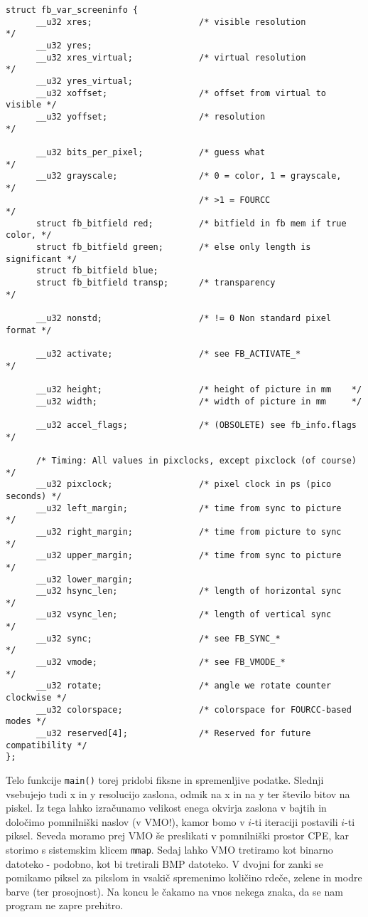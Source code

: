 \documentclass{article}
\begin{document}
\begin{verbatim}
struct fb_var_screeninfo {
      __u32 xres;                     /* visible resolution           */
      __u32 yres;
      __u32 xres_virtual;             /* virtual resolution           */
      __u32 yres_virtual;
      __u32 xoffset;                  /* offset from virtual to visible */
      __u32 yoffset;                  /* resolution                   */

      __u32 bits_per_pixel;           /* guess what                   */
      __u32 grayscale;                /* 0 = color, 1 = grayscale,    */
                                      /* >1 = FOURCC                  */
      struct fb_bitfield red;         /* bitfield in fb mem if true color, */
      struct fb_bitfield green;       /* else only length is significant */
      struct fb_bitfield blue;
      struct fb_bitfield transp;      /* transparency                 */

      __u32 nonstd;                   /* != 0 Non standard pixel format */

      __u32 activate;                 /* see FB_ACTIVATE_*            */

      __u32 height;                   /* height of picture in mm    */
      __u32 width;                    /* width of picture in mm     */

      __u32 accel_flags;              /* (OBSOLETE) see fb_info.flags */

      /* Timing: All values in pixclocks, except pixclock (of course) */
      __u32 pixclock;                 /* pixel clock in ps (pico seconds) */
      __u32 left_margin;              /* time from sync to picture    */
      __u32 right_margin;             /* time from picture to sync    */
      __u32 upper_margin;             /* time from sync to picture    */
      __u32 lower_margin;
      __u32 hsync_len;                /* length of horizontal sync    */
      __u32 vsync_len;                /* length of vertical sync      */
      __u32 sync;                     /* see FB_SYNC_*                */
      __u32 vmode;                    /* see FB_VMODE_*               */
      __u32 rotate;                   /* angle we rotate counter clockwise */
      __u32 colorspace;               /* colorspace for FOURCC-based modes */
      __u32 reserved[4];              /* Reserved for future compatibility */
};
\end{verbatim}

Telo funkcije \lstinline{main()} torej pridobi fiksne in spremenljive podatke. Slednji vsebujejo tudi x in y resolucijo zaslona, odmik na x in na y ter število bitov na piskel. Iz tega lahko izračunamo velikost enega okvirja zaslona v bajtih in določimo pomnilniški naslov (v VMO!), kamor bomo v $i$-ti iteraciji postavili $i$-ti piksel. Seveda moramo prej VMO še preslikati v pomnilniški prostor CPE, kar storimo s sistemskim klicem \lstinline{mmap}.
Sedaj lahko VMO tretiramo kot binarno datoteko - podobno, kot bi tretirali BMP datoteko. V dvojni for zanki se pomikamo piksel za pikslom in vsakič spremenimo količino rdeče, zelene in modre barve (ter prosojnost). Na koncu le čakamo na vnos nekega znaka, da se nam program ne zapre prehitro.
\end{document}
